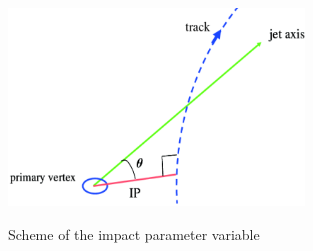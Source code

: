  \begin{figure}[h] 
 \centering
 \caption{Scheme of the impact parameter variable}
 \includegraphics[width=0.7\textwidth]{./Capitulos/VariableDefinitions/impactParameter}  
 \label{Impact_parameter}
 \end{figure} 

 
 
 
 
 
 
 
 
 
 
 
 
 
 
 
 
 
 
 